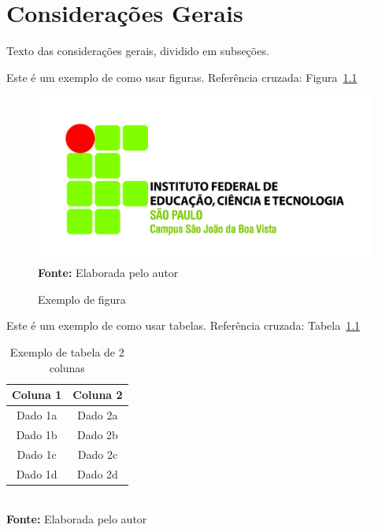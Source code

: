 \chapter{Considerações Gerais}
\label{cap:02}

Texto das considerações gerais, dividido em subseções.

Este é um exemplo de como usar figuras. Referência cruzada: Figura~\ref{fig:exemplo}

\FloatBarrier
\begin{figure}[!htbp]
	\centering
	\caption{Exemplo de figura}
	\includegraphics[scale=1.5]{imagens/exemploFigura}
	\\\textbf{Fonte:} Elaborada pelo autor
	\label{fig:exemplo}
\end{figure}
\FloatBarrier


Este é um exemplo de como usar tabelas. Referência cruzada: Tabela~\ref{tab:exemplo}

\FloatBarrier
\begin{table}[!htbp]
	\centering
	\caption{Exemplo de tabela de 2 colunas}
	\begin{tabular}{ c | c }
		\hline
		\textbf{Coluna 1} & \textbf{Coluna 2} \\ \hline
		Dado 1a           & Dado 2a           \\ \hline
		Dado 1b           & Dado 2b           \\ \hline
		Dado 1c           & Dado 2c           \\ \hline
		Dado 1d           & Dado 2d           \\ \hline
	\end{tabular}
	\\ \vspace{0.2cm}
	\textbf{Fonte:} Elaborada pelo autor
	\label{tab:exemplo}
\end{table}
\FloatBarrier


